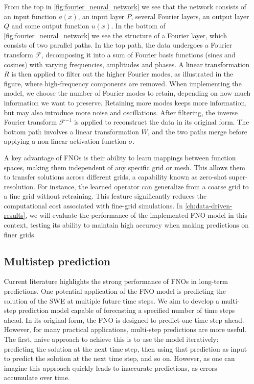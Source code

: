 From the top in \autoref{fig:fourier_neural_network} we see that the network consists of an input function $a(x)$, an input layer $P$, several Fourier layers, an output layer $Q$ and some output function $u(x)$.
In the bottom of \autoref{fig:fourier_neural_network} we see the structure of a Fourier layer, which consists of two parallel paths.
In the top path, the data undergoes a Fourier transform $\mathcal{F}$, decomposing it into a sum of Fourier basis functions (sines and cosines) with varying frequencies, amplitudes and phases.
A linear transformation $R$ is then applied to filter out the higher Fourier modes, as illustrated in the figure, where high-frequency components are removed.
When implementing the model, we choose the number of Fourier modes to retain, depending on how much information we want to preserve.
Retaining more modes keeps more information, but may also introduce more noise and oscillations.
After filtering, the inverse Fourier transform $\mathcal{F}^{-1}$ is applied to reconstruct the data in its original form.
The bottom path involves a linear transformation $W$, and the two paths merge before applying a non-linear activation function $\sigma$.

A key advantage of FNOs is their ability to learn mappings between function spaces, making them independent of any specific grid or mesh.
This allows them to transfer solutions across different grids, a capability known as zero-shot super-resolution.
For instance, the learned operator can generalize from a coarse grid to a fine grid without retraining.
This feature significantly reduces the computational cost associated with fine-grid simulations.
In \autoref{ch:data-driven-results}, we will evaluate the performance of the implemented FNO model in this context, testing its ability to maintain high accuracy when making predictions on finer grids.

\subsection*{Multistep prediction}
Current literature highlights the strong performance of FNOs in long-term predictions.
One potential application of the FNO model is predicting the solution of the SWE at multiple future time steps.
We aim to develop a multi-step prediction model capable of forecasting a specified number of time steps ahead.
In its original form, the FNO is designed to predict one time step ahead.
However, for many practical applications, multi-step predictions are more useful.
The first, naive approach to achieve this is to use the model iteratively: predicting the solution at the next time step, then using that prediction as input to predict the solution at the next time step, and so on.
However, as one can imagine this approach quickly leads to inaccurate predictions, as errors accumulate over time.

